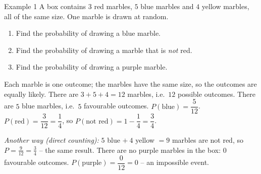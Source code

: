 \begin{exbox}{Example 1}
A box contains $3$ red marbles, $5$ blue marbles and $4$ yellow marbles, all of the same size. One marble is drawn at random.
\begin{enumerate}[label=\alph*),leftmargin=1.5em,itemsep=0pt,topsep=2pt]
\item Find the probability of drawing a blue marble.
\item Find the probability of drawing a marble that is \emph{not} red.
\item Find the probability of drawing a purple marble.
\end{enumerate}
\guide
{}
Each marble is one outcome; the marbles have the same size, so the outcomes are equally likely. There are $3+5+4=12$ marbles, i.e.\ $12$ possible outcomes.
There are $5$ blue marbles, i.e.\ $5$ favourable outcomes.
$P(\text{blue})=\dfrac{5}{12}$.
$P(\text{red})=\dfrac{3}{12}=\dfrac14$, so $P(\text{not red})=1-\dfrac14=\dfrac34$.

\emph{Another way (direct counting):} $5$ blue $+\ 4$ yellow $=9$ marbles are not red, so $P=\frac{9}{12}=\frac34$ -- the same result.
There are no purple marbles in the box: $0$ favourable outcomes. $P(\text{purple})=\dfrac{0}{12}=0$ -- an impossible event.
\end{exbox}

